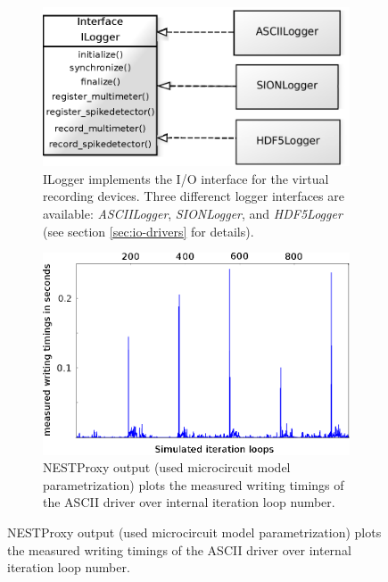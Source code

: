 \documentclass[]{YIC2015}
\begin{document}
\begin{figure}[tb]
\centering %
\begin{subfigure}[b]{0.5\textwidth}
                \includegraphics[width=.85\linewidth]{loggerinterface.eps}
                \caption{ILogger implements the I/O interface for the virtual
			recording devices.  Three differenct logger interfaces are
			available: \emph{ASCIILogger}, \emph{SIONLogger}, and
			\emph{HDF5Logger} (see section \ref{sec:io-drivers} for details). \cite{yuml}}
                \label{fig:loggerinterface}
        \end{subfigure}%
        \begin{subfigure}[b]{0.5\textwidth}
	      \includegraphics[width=.85\linewidth]{ascii_plot_10_8.eps}
	      \caption{NESTProxy output (used microcircuit model parametrization) plots the measured writing timings of the ASCII driver over internal iteration loop number.
	      \cite{yuml}}
	      \label{fig:asciiplot}
        \end{subfigure}%


\end{figure}

\end{document}
